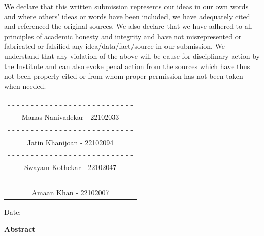\documentclass[12pt,a4paper,oneside]{report}
\theoremstyle{definition}
\theoremstyle{remark}
\begin{document}
\vspace{0.5cm}
\noindent We declare that this written submission represents our ideas in our own words and where others' ideas or words have been included, we have adequately cited and referenced the original sources. We also declare that we have adhered to all principles of academic honesty and integrity and have not misrepresented or fabricated or falsified any idea/data/fact/source in our submission. We understand that any violation of the above will be cause for disciplinary action by the Institute and can also evoke penal action from the sources which have thus not been properly cited or from whom proper permission has not been taken when needed.

\vspace{2cm}

\begin{flushright}
\begin{tabular}{c}
- - - - - - - - - - - - - - - - - - - - - - - - - - - \\
Manas Nanivadekar - 22102033 \\[1.5cm]
- - - - - - - - - - - - - - - - - - - - - - - - - - - \\
Jatin Khanijoan - 22102094 \\[1.5cm]
- - - - - - - - - - - - - - - - - - - - - - - - - - - \\
Swayam Kothekar - 22102047 \\[1.5cm]
- - - - - - - - - - - - - - - - - - - - - - - - - - - \\
Amaan Khan - 22102007 \\
\end{tabular}
\end{flushright}

\vspace{1cm}

\noindent Date:


\newpage


\begin{center}
\textbf{\Large Abstract}
\end{center}
\end{document}
